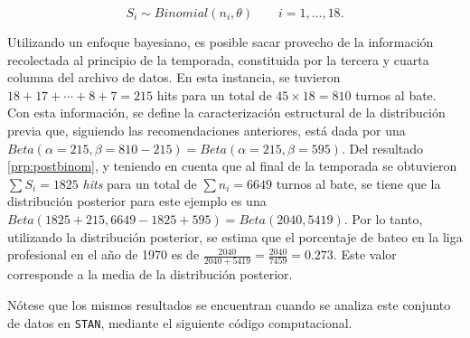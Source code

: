 \documentclass[
  10pt,
  spanish,
]{book}
\theoremstyle{definition}
\theoremstyle{definition}
\theoremstyle{definition}
\theoremstyle{definition}
\theoremstyle{remark}
\begin{document}
\begin{equation*}
S_i\sim Binomial (n_i,\theta) \ \ \ \ \ \ \ \ \ i=1,\ldots,18.
\end{equation*}

Utilizando un enfoque bayesiano, es posible sacar provecho de la información recolectada al principio de la temporada, constituida por la tercera y cuarta columna del archivo de datos. En esta instancia, se tuvieron \(18+17+\cdots+8+7=215\) hits para un total de \(45\times 18= 810\) turnos al bate. Con esta información, se define la caracterización estructural de la distribución previa que, siguiendo las recomendaciones anteriores, está dada por una \(Beta(\alpha=215, \beta=810-215)=Beta(\alpha=215, \beta=595)\). Del resultado \ref{prp:postbinom}, y teniendo en cuenta que al final de la temporada se obtuvieron \(\sum S_i = 1825\) \emph{hits} para un total de \(\sum n_i =6649\) turnos al bate, se tiene que la distribución posterior para este ejemplo es una \(Beta(1825+215,6649-1825+595)=Beta(2040, 5419)\). Por lo tanto, utilizando la distribución posterior, se estima que el porcentaje de bateo en la liga profesional en el año de 1970 es de \(\frac{2040}{2040+5419}=\frac{2040}{7459}=0.273\). Este valor corresponde a la media de la distribución posterior.

Nótese que los mismos resultados se encuentran cuando se analiza este conjunto de datos en \texttt{STAN}, mediante el siguiente código computacional.
\end{document}
